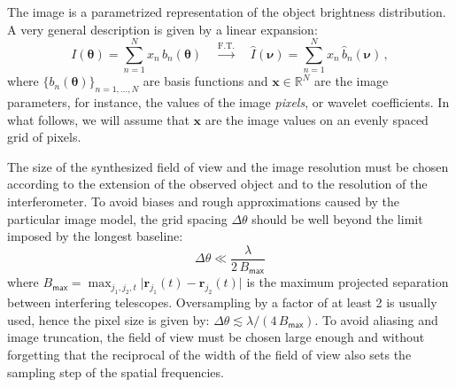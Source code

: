 \documentclass{article}
\newcommand{\Tag}[1]{\mathsf{#1}}        %
\newcommand{\V}[1]{\boldsymbol{#1}}      %
\newcommand{\FT}[1]{\hat{#1}}            %
\newcommand{\abs}[1]{\vert #1\vert}
\newcommand{\Reals}{\mathbb{R}}
\newcommand{\Freq}{\nu}               %
\newcommand{\VFreq}{\V{\Freq}}
\newcommand{\Dirn}{\theta}            %
\newcommand{\VDirn}{\V{\Dirn}}
\newcommand{\Posn}{r}                 %
\newcommand{\VPosn}{\V{\Posn}}
\newcommand{\Image}{I}
\newcommand{\Param}{x}
\newcommand{\VParam}{\V{\Param}}
\newcommand{\BasisFunc}{b}
\newcommand{\Baseline}{B}
\newcommand{\MaxBaseline}{\Baseline_\Tag{max}}
\begin{document}
The image is a parametrized representation of the object brightness
distribution.  A very general description is given by a linear expansion:
\begin{equation}
  \label{eq:general-image-model}
  \Image(\VDirn) = \sum_{n=1}^{N} \Param_n \, \BasisFunc_n(\VDirn)
  \quad \stackrel{\mathrm{F.T.}}{\longrightarrow}\quad
  \FT{\Image}(\VFreq) = \sum_{n=1}^{N} \Param_n \, \FT{\BasisFunc}_n(\VFreq)
  \,,  
\end{equation}
where $\{\BasisFunc_n(\VDirn)\}_{n=1,\ldots,N}$ are basis functions and
$\VParam\in\Reals^N$ are the image parameters, for instance, the values of the
image \emph{pixels}, or wavelet coefficients.  In what follows, we will assume
that $\V\Param$ are the image values on an evenly spaced grid of pixels.


The size of the synthesized field of view and the image resolution must be
chosen according to the extension of the observed object and to the resolution
of the interferometer.  To avoid biases and rough approximations caused by the
particular image model, the grid spacing $\Delta\Dirn$ should be well beyond
the limit imposed by the longest baseline:
\begin{equation}
  \label{eq:diffraction-limit}
  \Delta\Dirn \ll \frac{\lambda}{2\,\MaxBaseline}
\end{equation}
where $\MaxBaseline=\max_{j_1,j_2,t}\abs{\VPosn_{j_1}(t) - \VPosn_{j_2}(t)}$
is the maximum projected separation between interfering telescopes.
Oversampling by a factor of at least 2 is usually used, hence the pixel size is
given by: $\Delta\Dirn \lesssim \lambda/(4\,\MaxBaseline)$.  To avoid aliasing
and image truncation, the field of view must be chosen large enough and
without forgetting that the reciprocal of the width of the field of view also
sets the sampling step of the spatial frequencies.
\end{document}
